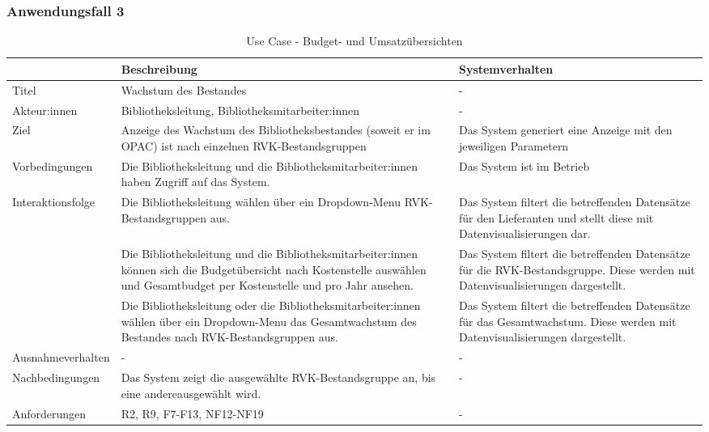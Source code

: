 \subsubsection{Anwendungsfall 3}

\begingroup
\setlength{\tabcolsep}{10pt} %
\renewcommand{\arraystretch}{1.25} 
\begin{table}[H]
    \centering
    \begin{adjustbox}{max width=\textwidth}
    \begin{tabular}{lp{6.5cm}p{6.5cm}}
       \toprule
       \textbf{}          & \textbf{Beschreibung} &\textbf{Systemverhalten}\\
       \midrule
        Titel                            &Wachstum des Bestandes& -\\
        Akteur:innen                     &Bibliotheksleitung, Bibliotheksmitarbeiter:innen & -\\
        Ziel                             &Anzeige des Wachstum des Bibliotheksbestandes (soweit er im OPAC) ist nach einzelnen RVK-Bestandsgruppen & Das System generiert eine Anzeige mit den jeweiligen Parametern\\
        Vorbedingungen                   &Die Bibliotheksleitung und die Bibliotheksmitarbeiter:innen haben Zugriff auf das System.& Das System ist im Betrieb\\
        Interaktionsfolge                &Die Bibliotheksleitung wählen über ein Dropdown-Menu RVK-Bestandsgruppen aus. & Das System filtert die betreffenden Datensätze für den Lieferanten und stellt diese mit Datenvisualisierungen dar.\\
                                        &Die Bibliotheksleitung und die Bibliotheksmitarbeiter:innen können sich die Budgetübersicht nach Kostenstelle auswählen und Gesamtbudget per Kostenstelle und pro Jahr ansehen.& Das System filtert die betreffenden Datensätze für die RVK-Bestandsgruppe. Diese werden mit Datenvisualisierungen dargestellt.\\
                                        &Die Bibliotheksleitung oder die Bibliotheksmitarbeiter:innen wählen über ein Dropdown-Menu das Gesamtwachstum des Bestandes nach RVK-Bestandsgruppen aus.&Das System filtert die betreffenden Datensätze für das Gesamtwachstum. Diese werden mit Datenvisualisierungen dargestellt.\\

        Ausnahmeverhalten               &- & -\\
        Nachbedingungen                 &Das System zeigt die ausgewählte RVK-Bestandsgruppe an, bis eine andereausgewählt wird. & -\\

        Anforderungen                   &R2, R9, F7-F13, NF12-NF19& -\\
        \bottomrule
    \end{tabular}
    \end{adjustbox}
    \caption{%
    Use Case - Budget- und Umsatzübersichten
    }
    \label{tab:UC_budget}
    \end{table}
\endgroup

